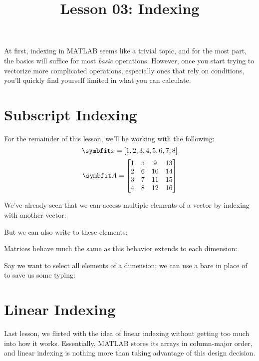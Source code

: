 \documentclass{article}
\title{Lesson 03: Indexing}
\begin{document}
\renderTitle

At first, indexing in MATLAB seems like a trivial topic, and for the
most part, the basics will suffice for most \emph{basic} operations.
However, once you start trying to vectorize more complicated operations,
especially ones that rely on conditions, you'll quickly find yourself
limited in what you can calculate.

\section{Subscript Indexing}

For the remainder of this lesson, we'll be working with the following:
\begin{equation}
	\mat{x}
	=
	[1, 2, 3, 4, 5, 6, 7, 8]
\end{equation}
\begin{equation}
	\mat{A}
	=
	\begin{bmatrix}
		1 & 5 &  9 & 13 \\
		2 & 6 & 10 & 14 \\
		3 & 7 & 11 & 15 \\
		4 & 8 & 12 & 16 \\
	\end{bmatrix}
\end{equation}

We've already seen that we can access multiple elements of a vector by
indexing with another vector:


But we can also write to these elements:


Matrices behave much the same as this behavior extends to each
dimension:


Say we want to select all elements of a dimension; we can use a bare
\mCommand{:} in place of  to save us some typing:


\section{Linear Indexing}

Last lesson, we flirted with the idea of linear indexing without getting
too much into how it works.  Essentially, MATLAB stores its arrays in
column-major order,  and linear indexing is nothing more than taking
advantage of this design decision.
\end{document}
